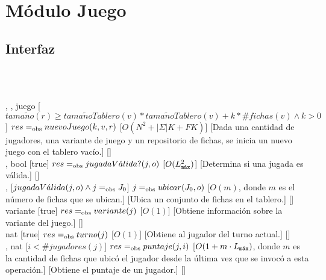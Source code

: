 \section{Módulo Juego}
\begin{interfaz}{\subsection{Interfaz}}
  \\\\
  \par\noindent
  \begin{operaciones}
    {, , }{juego}
    [$tama\tilde{n}o(r)\geq tama\tilde{n}oTablero(v)*tama\tilde{n}oTablero(v)+k*\#fichas(v)\land k>0$]
    {$res \igobs nuevoJuego(k,v,r)$}
    [$O(N^{2}+|\Sigma|K+FK)$]
    [Dada una cantidad de jugadores, una variante de juego y un repositorio de fichas, se inicia un nuevo juego con el tablero vacío.]
    [\falta]\\

    \noindent{}
    {, }{bool}
    [true]
    {$res\igobs jugadaV\acute{a}lida?(j,o)$}
    [$O(\Lmax^{2})$]
    [Determina si una jugada es válida.]
    [\falta]\\

    \noindent{}
    {, }{}
    [$jugadaV\acute{a}lida(j,o) \land j\igobs J_{0} $]
    {$j\igobs ubicar(J_{0},o)$}
    [$O(m)$, donde $m$ es el número de fichas que se ubican.]
    [Ubica un conjunto de fichas en el tablero.]
    [\falta]\\

    \noindent{}
    {}{variante}
    [true]
    {$res\igobs variante(j)$}
    [$O(1)$]
    [Obtiene información sobre la variante del juego.]
    [\falta]\\

    \noindent{}
    {}{nat}
    [true]
    {$res\igobs turno(j)$}
    [$O(1)$]
    [Obtiene al jugador del turno actual.]
    [\falta]\\

    \noindent{}
    {, }{nat}
    [$i < \#jugadores(j)$]
    {$res\igobs puntaje(j,i)$}
    [$O(1+m\cdot \Lmax)$, donde $m$ es la cantidad de fichas que ubicó el
jugador desde la última vez que se invocó a esta operación.]
    [Obtiene el puntaje de un jugador.]
    [\falta]\\


\end{operaciones}
\end{interfaz}

